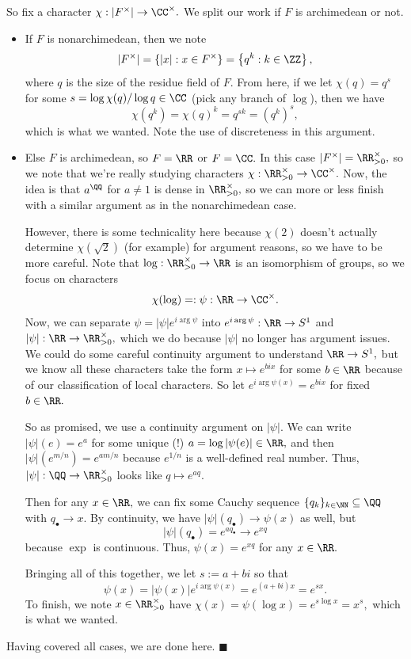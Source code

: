 So fix a character $\chi:|F^\times|\to\CC^\times.$ We split our work if $F$ is archimedean or not.
\begin{itemize}
    \item If $F$ is nonarchimedean, then we note
    \[|F^\times|=\{|x|:x\in F^\times\}=\left\{q^k:k\in\ZZ\right\},\]
    where $q$ is the size of the residue field of $F.$ From here, if we let $\chi(q)=q^s$ for some $s=\log\chi(q)/\log q\in\CC$ (pick any branch of $\log$), then we have
    \[\chi\left(q^k\right)=\chi(q)^k=q^{sk}=\left(q^k\right)^s,\]
    which is what we wanted. Note the use of discreteness in this argument.
    \item Else $F$ is archimedean, so $F=\RR$ or $F=\CC.$ In this case $|F^\times|=\RR^\times_{>0},$ so we note that we're really studying characters $\chi:\RR^\times_{>0}\to\CC^\times.$ Now, the idea is that $a^\QQ$ for $a\ne1$ is dense in $\RR^\times_{>0},$ so we can more or less finish with a similar argument as in the nonarchimedean case.
    
    However, there is some technicality here because $\chi(2)$ doesn't actually determine $\chi(\sqrt2)$ (for example) for argument reasons, so we have to be more careful. Note that $\log:\RR^\times_{>0}\to\RR$ is an isomorphism of groups, so we focus on characters
    \[\chi(\log)=:\psi:\RR\to\CC^\times.\]
    Now, we can separate $\psi=|\psi|e^{i\arg\psi}$ into $e^{i\arg\psi}:\RR\to S^1$ and $|\psi|:\RR\to\RR^\times_{>0},$ which we do because $|\psi|$ no longer has argument issues. We could do some careful continuity argument to understand $\RR\to S^1,$ but we know all these characters take the form $x\mapsto e^{bix}$ for some $b\in\RR$ because of our classification of local characters. So let $e^{i\arg\psi(x)}=e^{bix}$ for fixed $b\in\RR.$
    
    So as promised, we use a continuity argument on $|\psi|.$ We can write $|\psi|(e)=e^a$ for some unique (!) $a=\log|\psi(e)|\in\RR,$ and then $|\psi|\left(e^{m/n}\right)=e^{am/n}$ because $e^{1/n}$ is a well-defined real number. Thus, $|\psi|:\QQ\to\RR^\times_{>0}$ looks like $q\mapsto e^{aq}.$
    
    Then for any $x\in\RR,$ we can fix some Cauchy sequence $\{q_k\}_{k\in\NN}\subseteq\QQ$ with $q_\bullet\to x.$ By continuity, we have $|\psi|(q_\bullet)\to\psi(x)$ as well, but
    \[|\psi|(q_\bullet)=e^{aq_\bullet}\to e^{xq}\]
    because $\exp$ is continuous. Thus, $\psi(x)=e^{xq}$ for any $x\in\RR.$
    
    Bringing all of this together, we let $s:=a+bi$ so that
    \[\psi(x)=|\psi(x)|e^{i\arg\psi(x)}=e^{(a+bi)x}=e^{sx}.\]
    To finish, we note $x\in\RR^\times_{>0}$ have $\chi(x)=\psi(\log x)=e^{s\log x}=x^s,$ which is what we wanted.
\end{itemize}
Having covered all cases, we are done here. $\blacksquare$

